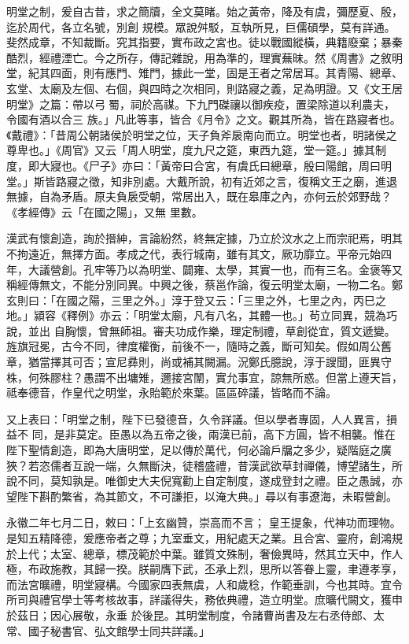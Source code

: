 \begin{pinyinscope}
 明堂之制，爰自古昔，求之簡牘，全文莫睹。始之黃帝，降及有虞，彌歷夏、殷，迄於周代，各立名號，別創
 規模。眾說舛駁，互執所見，巨儒碩學，莫有詳通。斐然成章，不知裁斷。究其指要，實布政之宮也。徒以戰國縱橫，典籍廢棄；暴秦酷烈，經禮湮亡。今之所存，傳記雜說，用為準的，理實蕪昧。然《周書》之敘明堂，紀其四面，則有應門、雉門，據此一堂，固是王者之常居耳。其青陽、總章、玄堂、太廟及左個、右個，與四時之次相同，則路寢之義，足為明證。又《文王居明堂》之篇：帶以弓蜀，祠於高禖。下九門磔禳以御疾疫，置梁除道以利農夫，令國有酒以合三
 族。」凡此等事，皆合《月令》之文。觀其所為，皆在路寢者也。《戴禮》：「昔周公朝諸侯於明堂之位，天子負斧扆南向而立。明堂也者，明諸侯之尊卑也。」《周官》又云「周人明堂，度九尺之筵，東西九筵，堂一筵。」據其制度，即大寢也。《尸子》亦曰：「黃帝曰合宮，有虞氏曰總章，殷曰陽館，周曰明堂。」斯皆路寢之徵，知非別處。大戴所說，初有近郊之言，復稱文王之廟，進退無據，自為矛盾。原夫負扆受朝，常居出入，既在皋庫之內，亦何云於郊野哉？《孝經傳》云「在國之陽」，又無
 里數。



 漢武有懷創造，詢於搢紳，言論紛然，終無定據，乃立於汶水之上而宗祀焉，明其不拘遠近，無擇方面。孝成之代，表行城南，雖有其文，厥功靡立。平帝元始四年，大議營創。孔牢等乃以為明堂、闢雍、太學，其實一也，而有三名。金褒等又稱經傳無文，不能分別同異。中興之後，蔡邕作論，復云明堂太廟，一物二名。鄭玄則曰：「在國之陽，三里之外。」淳于登又云：「三里之外，七里之內，丙巳之地。」潁容《釋例》亦云：「明堂太廟，凡有八名，其體一也。」茍立同異，競為巧說，並出
 自胸懷，曾無師祖。審夫功成作樂，理定制禮，草創從宜，質文遞變。旌旗冠冕，古今不同，律度權衡，前後不一，隨時之義，斷可知矣。假如周公舊章，猶當擇其可否；宣尼彞則，尚或補其闕漏。況鄭氏臆說，淳于謏聞，匪異守株，何殊膠柱？愚謂不出墉雉，邇接宮闈，實允事宜，諒無所惑。但當上遵天旨，祗奉德音，作皇代之明堂，永貽範於來葉。區區碎議，皆略而不論。



 又上表曰：「明堂之制，陛下已發德音，久令詳議。但以學者專固，人人異言，損益不
 同，是非莫定。臣愚以為五帝之後，兩漢已前，高下方圓，皆不相襲。惟在陛下聖情創造，即為大唐明堂，足以傳於萬代，何必論戶牖之多少，疑階庭之廣狹？若恣儒者互說一端，久無斷決，徒稽盛禮，昔漢武欲草封禪儀，博望諸生，所說不同，莫知孰是。唯御史大夫倪寬勸上自定制度，遂成登封之禮。臣之愚誠，亦望陛下斟酌繁省，為其節文，不可謙拒，以淹大典。」尋以有事遼海，未暇營創。



 永徽二年七月二日，敕曰：「上玄幽贊，崇高而不言；
 皇王提象，代神功而理物。是知五精降德，爰應帝者之尊；九室垂文，用紀處天之業。且合宮、靈府，創鴻規於上代；太室、總章，標茂範於中葉。雖質文殊制，奢儉異時，然其立天中，作人極，布政施教，其歸一揆。朕嗣膺下武，丕承上烈，思所以答眷上靈，聿遵孝享，而法宮曠禮，明堂寢構。今國家四表無虞，人和歲稔，作範垂訓，今也其時。宜令所司與禮官學士等考核故事，詳議得失，務依典禮，造立明堂。庶曠代闕文，獲申於茲日；因心展敬，永垂
 於後昆。其明堂制度，令諸曹尚書及左右丞侍郎、太常、國子秘書官、弘文館學士同共詳議。」




\end{pinyinscope}
